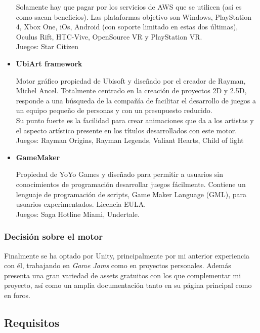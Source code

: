 \begin{itemize}
\quad Solamente hay que pagar por los servicios de AWS que se utilicen (así es como sacan beneficios). Las plataformas objetivo son Windows, PlayStation 4, Xbox One, iOs, Android (con soporte limitado en estas dos últimas), Oculus Rift, HTC-Vive, OpenSource VR y PlayStation VR.\\

\quad Juegos: Star Citizen\\

\item{\textbf{UbiArt framework}}

\quad Motor gráfico propiedad de Ubisoft y diseñado por el creador de Rayman, Michel Ancel. Totalmente centrado en la creación de proyectos 2D y 2.5D, responde a una
búsqueda de la compañía de facilitar el desarrollo de juegos a un equipo pequeño de personas y con un presupuesto reducido.\\

\quad Su punto fuerte es la facilidad para crear animaciones que da a los artistas y el aspecto artístico presente en los títulos desarrollados con este motor.\\

\quad Juegos: Rayman Origins, Rayman Legends, Valiant Hearts, Child of light \\

\item{\textbf{GameMaker}}

\quad Propiedad de YoYo Games y diseñado para permitir a usuarios sin conocimientos de programación desarrollar juegos fácilmente. Contiene un lenguaje de programación de scripts, Game Maker Language (GML), para usuarios experimentados. Licencia EULA.\\

\quad Juegos: Saga Hotline Miami, Undertale.\\
\end{itemize}

\subsubsection{Decisión sobre el motor}
\quad Finalmente se ha optado por Unity, principalmente por mi anterior experiencia con él, trabajando en \textit{Game Jams} como en proyectos personales. Además presenta una gran variedad de assets gratuitos con los que complementar mi proyecto, así como un amplia documentación tanto en su página principal como en foros.

\subsection{Requisitos}

